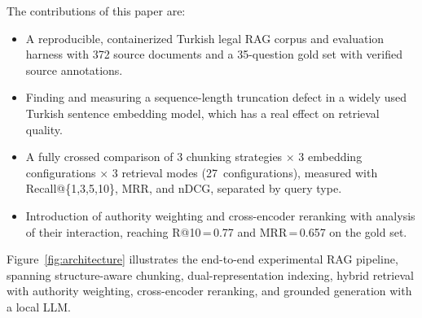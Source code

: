 \documentclass[11pt,a4paper,twocolumn]{article}
\begin{document}
The contributions of this paper are:

\begin{itemize}[leftmargin=*]
  \item A reproducible, containerized Turkish legal RAG corpus and evaluation harness with 372 source documents and a 35-question gold set with verified source annotations.
  \item Finding and measuring a sequence-length truncation defect in a widely used Turkish sentence embedding model, which has a real effect on retrieval quality.
  \item A fully crossed comparison of 3 chunking strategies $\times$ 3 embedding configurations $\times$ 3 retrieval modes (27~configurations), measured with Recall@\{1,3,5,10\}, MRR, and nDCG, separated by query type.
  \item Introduction of authority weighting and cross-encoder reranking with analysis of their interaction, reaching R@10\,=\,0.77 and MRR\,=\,0.657 on the gold set.
\end{itemize}

Figure~\ref{fig:architecture} illustrates the end-to-end experimental RAG pipeline, spanning structure-aware chunking, dual-representation indexing, hybrid retrieval with authority weighting, cross-encoder reranking, and grounded generation with a local LLM.
\end{document}
